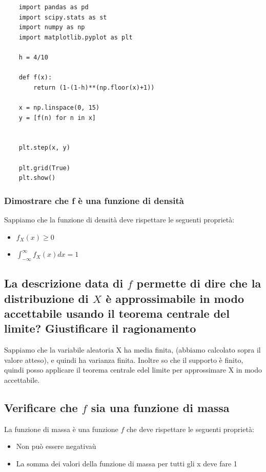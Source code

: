 \documentclass{article}
\begin{document}
\begin{lstlisting}
    import pandas as pd
    import scipy.stats as st
    import numpy as np
    import matplotlib.pyplot as plt

    h = 4/10

    def f(x):
        return (1-(1-h)**(np.floor(x)+1))

    x = np.linspace(0, 15)
    y = [f(n) for n in x]


    plt.step(x, y)

    plt.grid(True)
    plt.show()
\end{lstlisting}

\subsubsection*{Dimostrare che f è una funzione di densità}


Sappiamo che la funzione di densità deve rispettare le seguenti proprietà:

\begin{itemize}
    \item $f_X(x) \geq 0$
    \item $\int_{-\infty}^{\infty}f_X(x) dx = 1$

\end{itemize}

\subsection*{La descrizione data di $f$ permette di dire che la distribuzione di $X$ è approssimabile in modo accettabile usando il teorema centrale del limite? Giustificare il ragionamento}

Sappiamo che la variabile aleatoria X ha media finita, (abbiamo calcolato sopra il valore atteso), e quindi ha varianza finita. Inoltre so che il supporto è finito, quindi posso applicare il teorema centrale edel limite per approssimare X in modo accettabile.

\subsection*{Verificare che $f$ sia una funzione di massa}

La funzione di massa è una funzione $f$ che deve rispettare le seguenti proprietà:

\begin{itemize}
    \item Non può essere negativaù
    \item La somma dei valori della funzione di massa per tutti gli x deve fare 1
\end{itemize}
\end{document}
